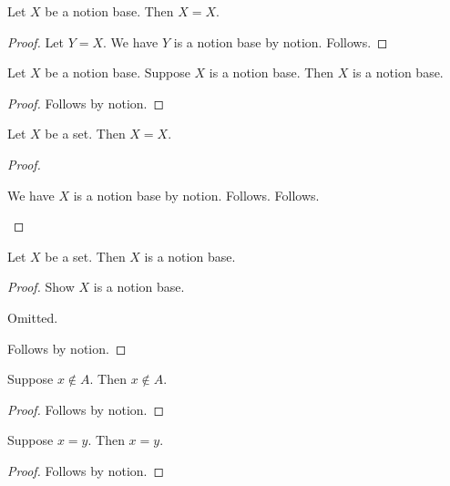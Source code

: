 \begin{proposition}\label{notion_proof_alias}
    Let $X$ be a notion base.
    Then $X=X$.
\end{proposition}
\begin{proof}
    Let $Y=X$.
    We have $Y$ is a notion base by notion.
    Follows.
\end{proof}

\begin{proposition}\label{notion_proof_duplicate_local}
    Let $X$ be a notion base.
    Suppose $X$ is a notion base.
    Then $X$ is a notion base.
\end{proposition}
\begin{proof}
    Follows by notion.
\end{proof}

\begin{proposition}\label{notion_proof_case_source}
    Let $X$ be a set.
    Then $X=X$.
\end{proposition}
\begin{proof}
    \begin{byCase}
        We have $X$ is a notion base by notion.
        Follows.
        Follows.
    \end{byCase}
\end{proof}

\begin{proposition}\label{notion_proof_escape_local}
    Let $X$ be a set.
    Then $X$ is a notion base.
\end{proposition}
\begin{proof}
    Show $X$ is a notion base.
    \begin{subproof}
        Omitted.
    \end{subproof}
    Follows by notion.
\end{proof}

\begin{proposition}\label{notion_proof_whole_negation}
    Suppose $x\notin A$.
    Then $x\notin A$.
\end{proposition}
\begin{proof}
    Follows by notion.
\end{proof}

\begin{proposition}\label{notion_proof_whole_equality}
    Suppose $x=y$.
    Then $x=y$.
\end{proposition}
\begin{proof}
    Follows by notion.
\end{proof}

